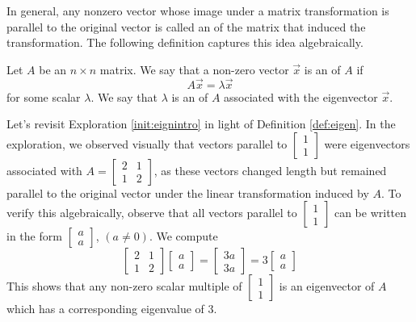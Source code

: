 \documentclass{ximera}
\begin{document}
In general, any nonzero vector whose image under a matrix transformation is parallel to the original vector is called an  of the matrix that induced the transformation.  The following definition captures this idea algebraically.
    
\begin{definition}\label{def:eigen}
Let $A$ be an $n \times n$ matrix.  We say that a non-zero vector $\vec{x}$ is an  of $A$ if $$A\vec{x} = \lambda \vec{x}$$
for some scalar $\lambda$.
We say that $\lambda$ is an  of $A$ associated with the eigenvector $\vec{x}$. %
\end{definition}
    
Let's revisit Exploration \ref{init:eignintro} in light of Definition \ref{def:eigen}.  In the exploration, we observed visually that vectors parallel to $\begin{bmatrix} 1\\ 1 \end{bmatrix}$ were eigenvectors associated with $A=\begin{bmatrix} 2& 1\\ 1&2
\end{bmatrix}$, as these vectors changed length but remained parallel to the original vector under the linear transformation induced by $A$.  To verify this algebraically, observe that all vectors parallel to $\begin{bmatrix} 1\\ 1 \end{bmatrix}$ can be written in the form $\begin{bmatrix} a\\ a \end{bmatrix}$, $(a\neq 0)$.  We compute
$$\begin{bmatrix} 2& 1\\ 1&2 \end{bmatrix} \begin{bmatrix} a\\ a \end{bmatrix} =
\begin{bmatrix} 3a\\ 3a \end{bmatrix}= 3 \begin{bmatrix} a\\ a \end{bmatrix}$$
This shows that any non-zero scalar multiple of $\begin{bmatrix} 1\\ 1 \end{bmatrix}$ is an eigenvector of $A$ which has a corresponding eigenvalue of 3.
    
\end{document}
